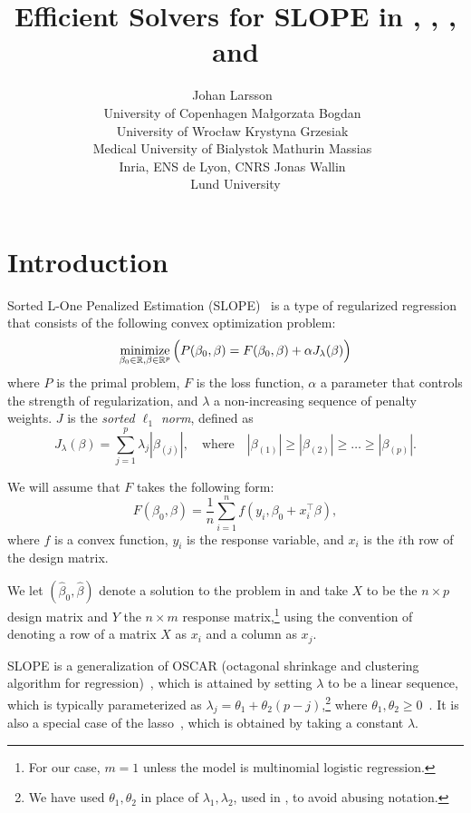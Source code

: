 \documentclass[article]{jss}
\author{
  Johan Larsson~\orcidlink{0000-0002-4029-5945}\\University of Copenhagen
  \And
  Ma\l{}gorzata Bogdan~\orcidlink{0000-0001-6355-8261}\\University of Wroc\l{}aw
  \And
  Krystyna Grzesiak~\orcidlink{0000-0003-2581-7722}\\Medical University of Bialystok
  \AND
  Mathurin Massias~\orcidlink{0000-0002-8950-0356}\\Inria, ENS de Lyon, CNRS
  \And
  Jonas Wallin~\orcidlink{0000-0003-0381-6593}\\Lund University
}
\title{Efficient Solvers for SLOPE in \proglang{R}, \proglang{Python}, \proglang{Julia}, and \proglang{C++}}
\let\Cref\crtCref
\begin{document}
\section{Introduction}

Sorted L-One Penalized Estimation
(SLOPE)~\citep{bogdan2013,zeng2014,bogdan2015} is a type of
regularized regression that consists of the following convex optimization problem:
\begin{equation}
  \label{eq:slope}
  \operatorname*{minimize}_{\beta_0 \in \mathbb{R},\beta \in \mathbb{R}^p}
  \Big(
  P(\beta_0,\beta)
  = F(\beta_0, \beta) + \alpha J_{\lambda}(\beta)
  \Big)
\end{equation}
where \(P\) is the primal problem, \(F\) is the loss function, \(\alpha\) a parameter
that controls the strength of regularization, and \(\lambda\) a non-increasing sequence of penalty weights. \(J\) is the
\emph{sorted $\ell_1$ norm}, defined as
\begin{equation}
  \label{eq:sl1}
  J_{\lambda}(\beta) = \sum_{j=1}^p \lambda_j |\beta_{(j)}|, \quad
  \text{where}\quad |\beta_{(1)}| \geq |\beta_{(2)}| \geq \ldots \geq
  |\beta_{(p)}|.
\end{equation}

We will assume that \(F\) takes the following form:
\[
  F(\beta_0, \beta) = \frac{1}{n} \sum_{i=1}^n f(y_i, \beta_0 + x_i^\intercal \beta),
\]
where \(f\) is a convex function, \(y_i\) is the response variable, and
\(x_i\) is the \(i\)th row of the design matrix.

We let \((\hat{\beta}_0, \hat{\beta})\) denote a solution to the problem in \Cref{eq:slope}
and take \(X\) to be the \(n \times p\) design matrix and \(Y\) the
\(n \times m\) response matrix,\footnote{For our case, \(m = 1\) unless
  the model is multinomial logistic regression.} using the convention
of denoting a row of a matrix \(X\) as \(x_i\) and a column as \(x_j\).

SLOPE is a generalization of OSCAR (octagonal shrinkage and clustering
algorithm for regression)~\citep{bondell2008}, which is attained by
setting \(\lambda\) to be a linear sequence, which is typically parameterized as
\(\lambda_j = \theta_1 + \theta_2(p - j)\),\footnote{We have used \(\theta_1,\theta_2\) in place of
  \(\lambda_1,\lambda_2\), used in \citet{bondell2008}, to avoid abusing notation.} where \(\theta_1, \theta_2
\geq 0\)~\citep{figueiredo2014}. It is also a special case of
the lasso~\citep{santosa1986,donoho1994,donoho1995,tibshirani1996},
which is obtained by taking a constant \(\lambda\).
\end{document}
